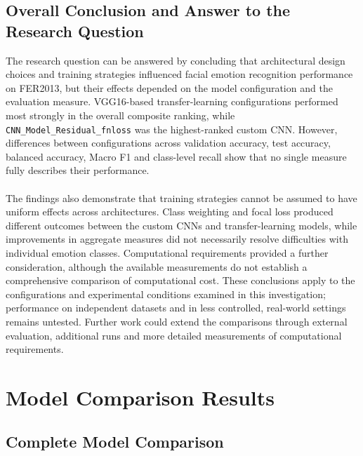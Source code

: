 \documentclass[12pt, a4paper]{report}
\let\oldsection\section
\renewcommand{\section}{%
    \Needspace{6\baselineskip}%
    \oldsection
}
\begin{document}
			
		\section{Overall Conclusion and Answer to the Research Question}
			
			The research question can be answered by concluding that architectural design choices and training strategies influenced facial emotion recognition performance on FER2013, but their effects depended on the model configuration and the evaluation measure. VGG16-based transfer-learning configurations performed most strongly in the overall composite ranking, while \texttt{CNN\_Model\_Residual\_fnloss} was the highest-ranked custom CNN. However, differences between configurations across validation accuracy, test accuracy, balanced accuracy, Macro F1 and class-level recall show that no single measure fully describes their performance.\\\\
			The findings also demonstrate that training strategies cannot be assumed to have uniform effects across architectures. Class weighting and focal loss produced different outcomes between the custom CNNs and transfer-learning models, while improvements in aggregate measures did not necessarily resolve difficulties with individual emotion classes. Computational requirements provided a further consideration, although the available measurements do not establish a comprehensive comparison of computational cost. These conclusions apply to the configurations and experimental conditions examined in this investigation; performance on independent datasets and in less controlled, real-world settings remains untested. Further work could extend the comparisons through external evaluation, additional runs and more detailed measurements of computational requirements.
			
	
	\printbibliography[heading=bibintoc, title={References}]
	
	
	\appendix
	
	\chapter{Model Comparison Results}
		
		\section{Complete Model Comparison}
			
\end{document}
